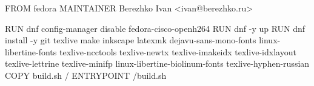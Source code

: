 FROM fedora
MAINTAINER Berezhko Ivan <ivan@berezhko.ru>

RUN dnf config-manager disable fedora-cisco-openh264
RUN dnf -y up
RUN dnf install -y git texlive make inkscape latexmk dejavu-sans-mono-fonts linux-libertine-fonts texlive-ncctools texlive-newtx texlive-imakeidx texlive-idxlayout texlive-lettrine texlive-minifp linux-libertine-biolinum-fonts texlive-hyphen-russian
COPY build.sh /
ENTRYPOINT /build.sh
